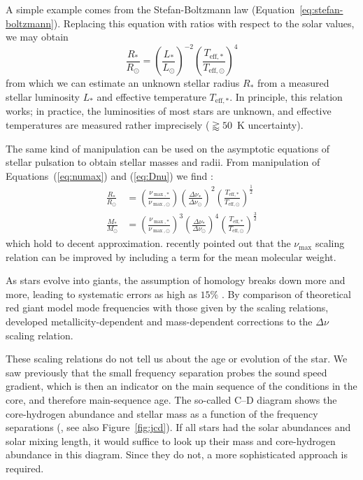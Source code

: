 A simple example comes from the Stefan-Boltzmann law (Equation~\ref{eq:stefan-boltzmann}). 
Replacing this equation with ratios with respect to the solar values, we may obtain 
\begin{equation}
    \frac{R_\ast}{R_\odot}
    =
    \left(
        \frac{L_\ast}{L_\odot}
    \right)^{-2}
    \left(
        \frac{T_{\text{eff},\ast}}{T_{\text{eff},\odot}}
    \right)^4
\end{equation}
from which we can estimate an unknown stellar radius $R_\ast$ from a measured stellar luminosity $L_\ast$ and effective temperature $T_{\text{eff},\ast}$. 
In principle, this relation works; in practice, the luminosities of most stars are unknown, and effective temperatures are measured rather imprecisely (${\gtrapprox 50}$~K uncertainty). 

The same kind of manipulation can be used on the asymptotic equations of stellar pulsation to obtain stellar masses and radii. 
From manipulation of Equations~(\ref{eq:numax}) and (\ref{eq:Dnu}) we find \citep[e.g.,][]{1995A&A...293...87K}:
\begin{align}
    \frac{R_\ast}{R_\odot}
    &=
    \left(
        \frac{\nu_{\max,\ast}}{\nu_{\max,\odot}}
    \right)
    \left(
        \frac{\Delta\nu_\ast}{\Delta\nu_\odot}
    \right)^2
    \left(
        \frac{T_{\text{eff},\ast}}{T_{\text{eff},\odot}}
    \right)^\frac{1}{2}
    \\
    \frac{M_\ast}{M_\odot}
    &=
    \left(
        \frac{\nu_{\max,\ast}}{\nu_{\max,\odot}}
    \right)^3
    \left(
        \frac{\Delta\nu_\ast}{\Delta\nu_\odot}
    \right)^4
    \left(
        \frac{T_{\text{eff},\ast}}{T_{\text{eff},\odot}}
    \right)^\frac{3}{2}
\end{align}
which hold to decent approximation. 
\citet{2017ApJ...843...11V} recently pointed out that the $\nu_{\max}$ scaling relation can be improved by including a term for the mean molecular weight. 

As stars evolve into giants, the assumption of homology breaks down more and more, leading to systematic errors as high as $15\%$ \citep[e.g.,][]{2016ApJ...832..121G}. 
By comparison of theoretical red giant model mode frequencies with those given by the scaling relations, \citet{2016MNRAS.460.4277G, 2017MNRAS.470.2069G} developed metallicity-dependent and mass-dependent corrections to the $\Delta\nu$ scaling relation. 

These scaling relations do not tell us about the age or evolution of the star. 
We saw previously that the small frequency separation probes the sound speed gradient, which is then an indicator on the main sequence of the conditions in the core, and therefore main-sequence age. 
The so-called C--D diagram shows the core-hydrogen abundance and stellar mass as a function of the frequency separations (\citealt{1984srps.conf...11C}, see also Figure~\ref{fig:jcd}). 
If all stars had the solar abundances and solar mixing length, it would suffice to look up their mass and core-hydrogen abundance in this diagram. 
Since they do not, a more sophisticated approach is required. 

